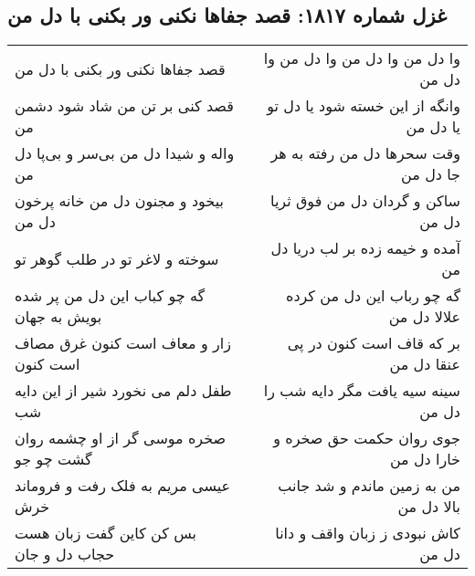 \begin{center}
\section*{غزل شماره ۱۸۱۷: قصد جفاها نکنی ور بکنی با دل من}
\label{sec:1817}
\begin{longtable}{l p{0.5cm} r}
قصد جفاها نکنی ور بکنی با دل من
&&
وا دل من وا دل من وا دل من وا دل من
\\
قصد کنی بر تن من شاد شود دشمن من
&&
وانگه از این خسته شود یا دل تو یا دل من
\\
واله و شیدا دل من بی‌سر و بی‌پا دل من
&&
وقت سحرها دل من رفته به هر جا دل من
\\
بیخود و مجنون دل من خانه پرخون دل من
&&
ساکن و گردان دل من فوق ثریا دل من
\\
سوخته و لاغر تو در طلب گوهر تو
&&
آمده و خیمه زده بر لب دریا دل من
\\
گه چو کباب این دل من پر شده بویش به جهان
&&
گه چو رباب این دل من کرده علالا دل من
\\
زار و معاف است کنون غرق مصاف است کنون
&&
بر که قاف است کنون در پی عنقا دل من
\\
طفل دلم می نخورد شیر از این دایه شب
&&
سینه سیه یافت مگر دایه شب را دل من
\\
صخره موسی گر از او چشمه روان گشت چو جو
&&
جوی روان حکمت حق صخره و خارا دل من
\\
عیسی مریم به فلک رفت و فروماند خرش
&&
من به زمین ماندم و شد جانب بالا دل من
\\
بس کن کاین گفت زبان هست حجاب دل و جان
&&
کاش نبودی ز زبان واقف و دانا دل من
\\
\end{longtable}
\end{center}

